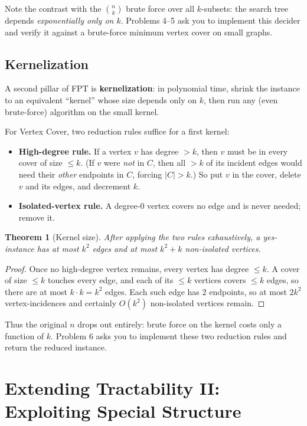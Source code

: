 \documentclass[11pt]{article}
\newtheorem{theorem}{Theorem}[section]
\begin{document}
Note the contrast with the $\binom{n}{k}$ brute force over all $k$-subsets: the
search tree depends \emph{exponentially only on $k$}. Problems 4--5 ask you to
implement this decider and verify it against a brute-force minimum vertex cover
on small graphs.

\subsection{Kernelization}

A second pillar of FPT is \textbf{kernelization}: in polynomial time, shrink
the instance to an equivalent ``kernel'' whose size depends only on $k$, then
run any (even brute-force) algorithm on the small kernel.

For Vertex Cover, two reduction rules suffice for a first kernel:

\begin{itemize}
    \item \textbf{High-degree rule.} If a vertex $v$ has degree $> k$, then $v$
    must be in every cover of size $\le k$. (If $v$ were \emph{not} in $C$, then
    all $> k$ of its incident edges would need their \emph{other} endpoints in
    $C$, forcing $|C| > k$.) So put $v$ in the cover, delete $v$ and its edges,
    and decrement $k$.
    \item \textbf{Isolated-vertex rule.} A degree-$0$ vertex covers no edge and
    is never needed; remove it.
\end{itemize}

\begin{theorem}[Kernel size]
After applying the two rules exhaustively, a yes-instance has at most $k^2$
edges and at most $k^2 + k$ non-isolated vertices.
\end{theorem}

\begin{proof}
Once no high-degree vertex remains, every vertex has degree $\le k$. A cover of
size $\le k$ touches every edge, and each of its $\le k$ vertices covers
$\le k$ edges, so there are at most $k \cdot k = k^2$ edges. Each such edge has
$2$ endpoints, so at most $2k^2$ vertex-incidences and certainly
$O(k^2)$ non-isolated vertices remain.
\end{proof}

Thus the original $n$ drops out entirely: brute force on the kernel costs only a
function of $k$. Problem 6 asks you to implement these two reduction rules and
return the reduced instance.

\section{Extending Tractability II: Exploiting Special Structure}
\end{document}
